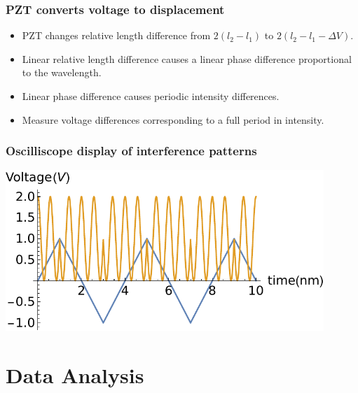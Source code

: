 \documentclass{beamer}
\begin{document}
\begin{frame}
  \frametitle{PZT converts voltage to displacement}
  \begin{itemize}
    \item PZT changes relative length difference from $2(l_2 - l_1)$ to $2(l_2 - l_1 - \Delta V)$.
    \item Linear relative length difference causes a linear phase difference proportional to the wavelength.
    \item Linear phase difference causes periodic intensity differences.
    \item Measure voltage differences corresponding to a full period in intensity.
  \end{itemize}
\end{frame}

\begin{frame}
  \frametitle{Oscilliscope display of interference patterns}
  \includegraphics[width=12cm]{waveform}
\end{frame}

\section{Data Analysis}
\end{document}
